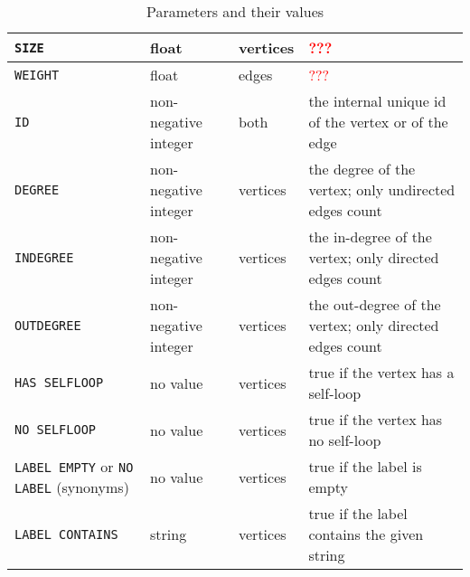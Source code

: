\begin{table}
\begin{tabular}{p{3cm}|p{5cm}|p{1.8cm}|p{5cm}}
    \hline
    \texttt{SIZE} & float                      & vertices \tcr{?}  & \textcolor{red}{???}\\
    \hline
    \texttt{WEIGHT} & float                      & edges  &
                                                            \textcolor{red}{???}\\
    \hline
    \texttt{ID}      & non-negative integer   & both & the internal unique id of
                                                       the vertex or of the edge\\
    \hline
    \texttt{DEGREE}    & non-negative integer & vertices & the degree of
                                                           the vertex;
                                                           only
                                                           undirected
                                                           edges count\\
    \hline
    \texttt{INDEGREE}    & non-negative integer & vertices & the in-degree of
                                                             the vertex;
                                                             only
                                                             directed
                                                             edges count\\
    \hline
    \texttt{OUTDEGREE}    & non-negative integer & vertices & the out-degree of
                                                              the vertex;
                                                              only
                                                              directed
                                                              edges count\\
    \hline
    \texttt{HAS SELFLOOP}  & no value & vertices & true if the vertex
                                                   has a self-loop\\
    \hline
    \texttt{NO SELFLOOP}  & no value & vertices & true if the vertex
                                                  has no self-loop\\
    \hline
    \texttt{LABEL EMPTY} or \texttt{NO LABEL} (synonyms)
                       & no value & vertices & true if the label is
                                               empty\\
    \hline
    \texttt{LABEL CONTAINS} & string & vertices & true if the label
                                                  contains the given string\\
    \hline
  \end{tabular}
  \caption{Parameters and their values}
  \label{tab:parsAndVals}
\end{table}

